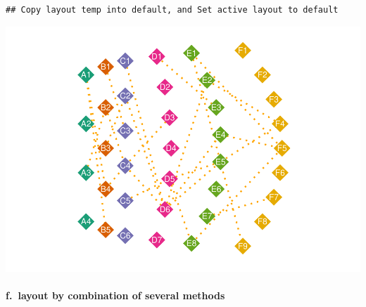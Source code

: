 \documentclass[
]{article}
\let\oldparagraph\paragraph
\renewcommand{\paragraph}[1]{\oldparagraph{#1}\mbox{}}
\begin{document}
\begin{verbatim}
## Copy layout temp into default, and Set active layout to default
\end{verbatim}

\includegraphics{ReadMe_files/figure-latex/unnamed-chunk-15-1.pdf}

\hypertarget{f.-layout-by-combination-of-several-methods}{%
\paragraph{f.~layout by combination of several
methods}\label{f.-layout-by-combination-of-several-methods}}
\end{document}
